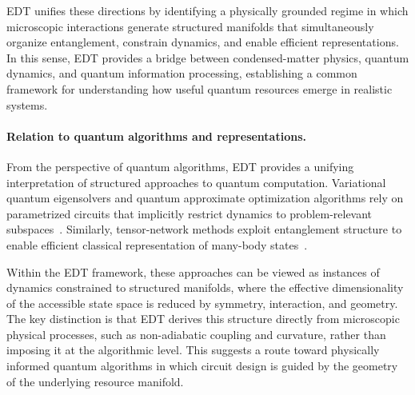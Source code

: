 \documentclass[twocolumn,10pt]{article}
\begin{document}
EDT unifies these directions by identifying a physically grounded regime in which microscopic interactions generate structured manifolds that simultaneously organize entanglement, constrain dynamics, and enable efficient representations. In this sense, EDT provides a bridge between condensed-matter physics, quantum dynamics, and quantum information processing, establishing a common framework for understanding how useful quantum resources emerge in realistic systems.

\paragraph*{Relation to quantum algorithms and representations.}

From the perspective of quantum algorithms, EDT provides a unifying interpretation of structured approaches to quantum computation. Variational quantum eigensolvers and quantum approximate optimization algorithms rely on parametrized circuits that implicitly restrict dynamics to problem-relevant subspaces~\cite{Peruzzo2014,Farhi2014}. Similarly, tensor-network methods exploit entanglement structure to enable efficient classical representation of many-body states~\cite{Schollwock2011}.

Within the EDT framework, these approaches can be viewed as instances of dynamics constrained to structured manifolds, where the effective dimensionality of the accessible state space is reduced by symmetry, interaction, and geometry. The key distinction is that EDT derives this structure directly from microscopic physical processes, such as non-adiabatic coupling and curvature, rather than imposing it at the algorithmic level. This suggests a route toward physically informed quantum algorithms in which circuit design is guided by the geometry of the underlying resource manifold.


\end{document}
